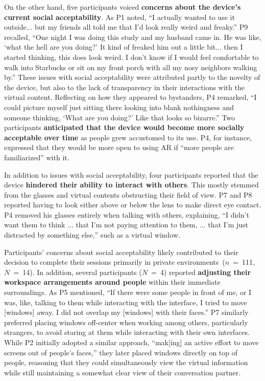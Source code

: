 On the other hand, five participants
voiced \textbf{concerns about the device's current social acceptability}.
As P1 noted, ``I actually wanted to use it outside... but my friends all told me that I'd look really weird and freaky.''
P9 recalled, ``One night I was doing this study and my husband came in. He was like, `what the hell are you doing?' It kind of freaked him out a little bit... then I started thinking, this does look weird. I don't know if I would feel comfortable to walk into Starbucks or sit on my front porch with all my nosy neighbors walking by.'' 
These issues with social acceptability were attributed partly to the novelty of the device, but also to the lack of transparency in their interactions with the virtual content.
Reflecting on how they appeared to bystanders, P4 remarked, ``I could picture myself just sitting there looking into blank nothingness and someone thinking, `What are you doing?' Like that looks so bizarre.''
Two participants
\textbf{anticipated that the device would become more socially acceptable over time} as people grew accustomed to its use.
P4, for instance, expressed that they would be more open to using AR if ``more people are familiarized'' with it.

In addition to issues with social acceptability, 
four participants 
reported that the device \textbf{hindered their ability to interact with others}.
This mostly stemmed from the glasses and virtual contents obstructing their field of view.
P7 and P8 reported having to look either above or below the lens to make direct eye contact. 
P4 removed his glasses entirely when talking with others, explaining, 
``I didn't want them to think ... that I'm not paying attention to them, ... that I'm just distracted by something else,'' such as a virtual window.

Participants' concerns about social acceptability likely contributed to their decision to complete their sessions primarily in private environments~($n$~=~111,~$N$~=~14).
In addition, 
several participants ($N$~=~4)
reported \textbf{adjusting their workspace arrangements around people} within their immediate surroundings. 
As P5 mentioned, ``If there were some people in front of me, or I was, like, talking to them while interacting with the interface, I tried to move [windows] away. I did not overlap my [windows] with their faces.''
P7 similarly preferred placing windows off-center when working among others, particularly strangers, to avoid staring at them while interacting with their own interfaces.
While P2 initially adopted a similar approach, ``mak[ing] an active effort to move screens out of people's faces,'' they later placed windows directly on top of people, reasoning that they could simultaneously view the virtual information while still maintaining a somewhat clear view of their conversation partner.

